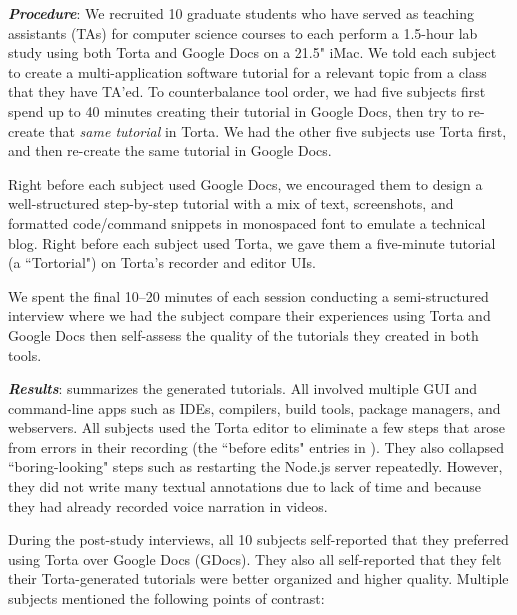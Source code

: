 \emph{\textbf{Procedure}}: We recruited 10 graduate students who have
served as teaching assistants (TAs) for computer science courses to each
perform a 1.5-hour lab study using both Torta and Google Docs on a 21.5"
iMac. We told each subject to create a multi-application software
tutorial for a relevant topic from a class that they have TA'ed. To
counterbalance tool order, we had five subjects first spend up to 40 minutes
creating their tutorial in Google Docs, then try to
re-create that \emph{same tutorial} in Torta. We had the other five
subjects use Torta first, and then re-create the same tutorial in Google
Docs.

Right before each subject used Google Docs, we encouraged them to design a
well-structured step-by-step tutorial with a mix of text, screenshots,
and formatted code/command snippets in monospaced font to emulate a
technical blog. Right before each subject used Torta, we gave
them a five-minute tutorial (a ``Tortorial") on Torta's recorder and
editor UIs.

We spent the final 10--20 minutes of each session conducting a
semi-structured interview where we had the subject compare their
experiences using Torta and Google Docs then self-assess the quality of
the tutorials they created in both tools.


\emph{\textbf{Results}}:  summarizes the
generated tutorials. All involved multiple GUI and command-line apps
such as IDEs, compilers, build tools, package managers, and webservers.
%
All subjects used the Torta editor to eliminate a few steps that arose
from errors in their recording (the ``before edits" entries in
). They also collapsed ``boring-looking" steps
such as restarting the Node.js server repeatedly. However, they did not
write many textual annotations due to lack of time and because they
had already recorded voice narration in videos.

During the post-study interviews, all
10 subjects self-reported that they preferred using Torta over Google
Docs (GDocs). They also all
self-reported that they felt their Torta-generated tutorials were better organized
and higher quality. Multiple subjects mentioned the following points of
contrast:

